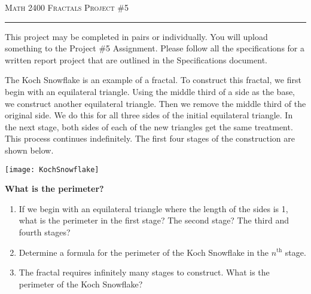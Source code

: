 \documentclass[12pt]{amsart}
\begin{document}
\thispagestyle{empty}

{\scshape Math 2400} \hfill {\scshape \large Fractals} \hfill {\scshape Project \#5}
 
\smallskip

\hrule

\bigskip

This project may be completed in pairs or individually.  You will upload something to the Project \#5 Assignment.  Please follow all the specifications for a written report project that are outlined in the Specifications document.

\bigskip

\bigskip

The Koch Snowflake is an example of a fractal.  To construct this fractal, we first begin with an equilateral triangle.  Using the middle third of a side as the base, we construct another equilateral triangle.  Then we remove the middle third of the original side.  We do this for all three sides of the initial equilateral triangle.  In the next stage, both sides of each of the new triangles get the same treatment.  This process continues indefinitely.  The first four stages of the construction are shown below.

\bigskip

\begin{center}\texttt{[image: KochSnowflake]}\end{center}

\vfill

{\bf What is the perimeter?}

\medskip

\begin{enumerate}

\item  If we begin with an equilateral triangle where the length of the sides is 1, what is the perimeter in the first stage?  The second stage?  The third and fourth stages?

\bigskip

\item  Determine a formula for the perimeter of the Koch Snowflake in the $n^\text{th}$ stage.

\bigskip

\item  The fractal requires infinitely many stages to construct.  What is the perimeter of the Koch Snowflake?

\bigskip

\end{enumerate}
\end{document}
